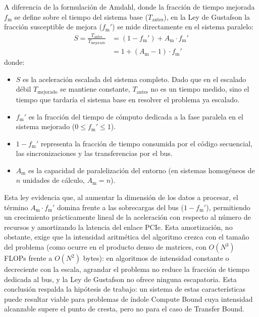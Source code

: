 \documentclass[a4paper,11pt]{article}
\begin{document}
A diferencia de la formulación de Amdahl, donde la fracción de tiempo mejorada $f_{\text{m}}$ se define sobre el tiempo del sistema base
($T_{\text{antes}}$), en la Ley de Gustafson la fracción susceptible de mejora ($f_{\text{m}}'$) se mide directamente en el
sistema paralelo:
\begin{equation}\label{eq:gustafson_relacionada}
\begin{split}
    S = \frac{T_{\text{antes}}}{T_{\text{mejorado}}}
      &= (1 - f_{\text{m}}') + A_{\text{m}} \cdot f_{\text{m}}' \\
      &= 1 + (A_{\text{m}} - 1) \cdot f_{\text{m}}'
\end{split}
\end{equation}
donde:
\begin{itemize}[leftmargin=*,noitemsep,topsep=2pt]
    \item $S$ es la aceleración escalada del sistema completo. Dado que en el escalado débil $T_{\text{mejorado}}$ se
    mantiene constante, $T_{\text{antes}}$ no es un tiempo medido, sino el tiempo que tardaría el sistema base en
    resolver el problema ya escalado.
    \item $f_{\text{m}}'$ es la fracción del tiempo de cómputo dedicada a la fase paralela en el sistema mejorado ($0 \le f_{\text{m}}' \le 1$).
    \item $1 - f_{\text{m}}'$ representa la fracción de tiempo consumida por el código secuencial, las sincronizaciones y las transferencias por el bus.
    \item $A_{\text{m}}$ es la capacidad de paralelización del entorno (en sistemas homogéneos de $n$ unidades de cálculo, $A_{\text{m}} = n$).
\end{itemize}

Esta ley evidencia que, al aumentar la dimensión de los datos a procesar, el término $A_{\text{m}} \cdot f_{\text{m}}'$ domina
frente a las sobrecargas del bus ($1 - f_{\text{m}}'$), permitiendo un crecimiento prácticamente lineal de la aceleración con respecto al
número de recursos y amortizando la latencia del enlace PCIe. Esta amortización, no obstante, exige que la intensidad aritmética
del algoritmo crezca con el tamaño del problema (como ocurre en el producto denso de matrices, con $O(N^3)$ FLOPs frente a
$O(N^2)$ bytes): en algoritmos de intensidad constante o decreciente con la escala, agrandar el problema no reduce la fracción
de tiempo dedicada al bus, y la Ley de Gustafson no ofrece ninguna escapatoria.
Esta conclusión respalda la hipótesis de trabajo: un sistema de estas características puede resultar viable 
para problemas de índole Compute Bound cuya intensidad alcanzable supere el punto de cresta, pero no para el caso de Transfer Bound.
\end{document}
